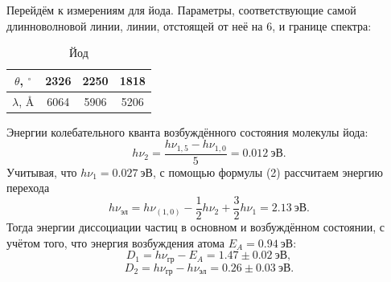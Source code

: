 \documentclass[a4paper,12pt]{article}
\theoremstyle{definition}
\begin{document}
	Перейдём к измерениям для йода. Параметры, соответствующие самой длинноволновой линии, линии, отстоящей от неё на 6, и границе спектра:

	\begin{table}[h]
		\centering
		\caption{Йод}
		\begin{tabular}{|c|c|c|c|} \hline
			$\theta$, $^\circ$ & 2326 & 2250 & 1818 \\ \hline
			$\lambda$, \AA	   & 6064 & 5906 & 5206 \\ \hline
		\end{tabular}
	\end{table}

	Энергии колебательного кванта возбуждённого состояния молекулы йода:
	\[h\nu_{2} = \dfrac{h\nu_{1,5} - h\nu_{1,0}}{5} = 0.012 ~\text{эВ}.\]
	Учитывая, что $h\nu_1 = 0.027~\text{эВ}$, с помощью формулы (2) рассчитаем энергию перехода
	\[h\nu_{\text{эл}} = h\nu_{(1,0)} - \dfrac{1}{2} h\nu_2 + \dfrac{3}{2} h\nu_1 = 2.13 ~\text{эВ}.\]
	Тогда энергии диссоциации частиц в основном и возбуждённом состоянии, с учётом того, что энергия возбуждения атома $E_A = 0.94~\text{эВ}$:
	\[D_1 = h\nu_{\text{гр}} - E_A = 1.47 \pm 0.02~\text{эВ},\]
	\[D_2 = h\nu_{\text{гр}} - h\nu_{\text{эл}} = 0.26 \pm 0.03~\text{эВ}.\]
	
	
\end{document}
